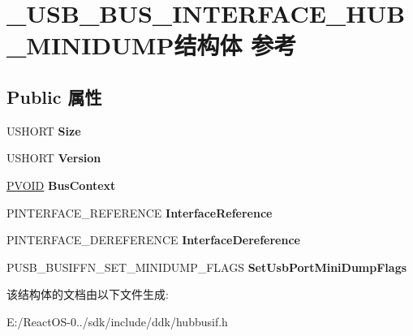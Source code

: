 \hypertarget{struct___u_s_b___b_u_s___i_n_t_e_r_f_a_c_e___h_u_b___m_i_n_i_d_u_m_p}{}\section{\+\_\+\+U\+S\+B\+\_\+\+B\+U\+S\+\_\+\+I\+N\+T\+E\+R\+F\+A\+C\+E\+\_\+\+H\+U\+B\+\_\+\+M\+I\+N\+I\+D\+U\+M\+P结构体 参考}
\label{struct___u_s_b___b_u_s___i_n_t_e_r_f_a_c_e___h_u_b___m_i_n_i_d_u_m_p}
\subsection*{Public 属性}
\begin{DoxyCompactItemize}
\item 
\mbox{\label{struct___u_s_b___b_u_s___i_n_t_e_r_f_a_c_e___h_u_b___m_i_n_i_d_u_m_p_a562ab296c7f4afec03dfaa7c66a5c709}} 
U\+S\+H\+O\+RT {\bfseries Size}
\item 
\mbox{\label{struct___u_s_b___b_u_s___i_n_t_e_r_f_a_c_e___h_u_b___m_i_n_i_d_u_m_p_ae96f22aad22a061166dbf8f60379414a}} 
U\+S\+H\+O\+RT {\bfseries Version}
\item 
\mbox{\label{struct___u_s_b___b_u_s___i_n_t_e_r_f_a_c_e___h_u_b___m_i_n_i_d_u_m_p_a87900fd888590044b6eb05c343bfc7b7}} 
\hyperlink{interfacevoid}{P\+V\+O\+ID} {\bfseries Bus\+Context}
\item 
\mbox{\label{struct___u_s_b___b_u_s___i_n_t_e_r_f_a_c_e___h_u_b___m_i_n_i_d_u_m_p_ae6fee73b57d87564555fd7dc6607a16b}} 
P\+I\+N\+T\+E\+R\+F\+A\+C\+E\+\_\+\+R\+E\+F\+E\+R\+E\+N\+CE {\bfseries Interface\+Reference}
\item 
\mbox{\label{struct___u_s_b___b_u_s___i_n_t_e_r_f_a_c_e___h_u_b___m_i_n_i_d_u_m_p_a75719453551398a101652b1b04f59a2b}} 
P\+I\+N\+T\+E\+R\+F\+A\+C\+E\+\_\+\+D\+E\+R\+E\+F\+E\+R\+E\+N\+CE {\bfseries Interface\+Dereference}
\item 
\mbox{\label{struct___u_s_b___b_u_s___i_n_t_e_r_f_a_c_e___h_u_b___m_i_n_i_d_u_m_p_a9ad7faa9923b2f10216c5fe33308694f}} 
P\+U\+S\+B\+\_\+\+B\+U\+S\+I\+F\+F\+N\+\_\+\+S\+E\+T\+\_\+\+M\+I\+N\+I\+D\+U\+M\+P\+\_\+\+F\+L\+A\+GS {\bfseries Set\+Usb\+Port\+Mini\+Dump\+Flags}
\end{DoxyCompactItemize}


该结构体的文档由以下文件生成\+:\begin{DoxyCompactItemize}
\item 
E\+:/\+React\+O\+S-\/0../sdk/include/ddk/hubbusif.\+h\end{DoxyCompactItemize}
